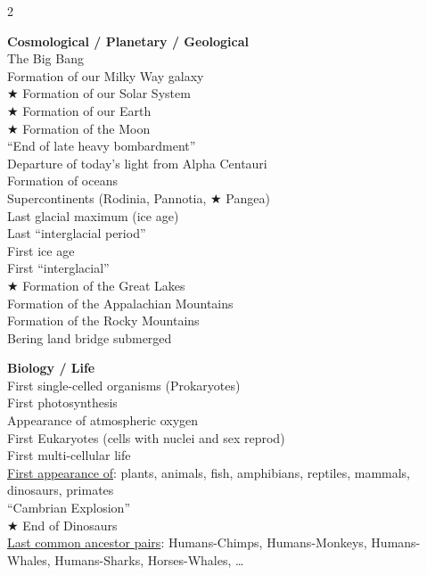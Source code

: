 \documentclass[12pt]{article}
\begin{document}
\begin{multicols}{2}


\begin{tcolorbox}[colback=white,colframe=black,boxrule=0.5pt,arc=2mm,
  left=4pt,right=4pt,top=6pt,bottom=6pt,height=11cm,valign=center]
\textbf{Cosmological / Planetary / Geological}\\[4pt]
The Big Bang\\
Formation of our Milky Way galaxy\\
$\bigstar$ Formation of our Solar System\\
$\bigstar$ Formation of our Earth\\
$\bigstar$ Formation of the Moon\\
``End of late heavy bombardment''\\
Departure of today's light from Alpha Centauri\\
Formation of oceans\\
Supercontinents (Rodinia, Pannotia, $\bigstar$ Pangea)\\
Last glacial maximum (ice age)\\
Last ``interglacial period''\\
First ice age\\
First ``interglacial''\\
$\bigstar$ Formation of the Great Lakes\\
Formation of the Appalachian Mountains\\
Formation of the Rocky Mountains\\
Bering land bridge submerged


\vspace{1.5cm}


\end{tcolorbox}
\vspace{6pt}
\begin{tcolorbox}[colback=white,colframe=black,boxrule=0.5pt,arc=2mm,
  left=4pt,right=4pt,top=6pt,bottom=6pt,height=11cm,valign=center]
\textbf{Biology / Life}\\[4pt]
First single-celled organisms (Prokaryotes)\\
First photosynthesis\\
Appearance of atmospheric oxygen\\
First Eukaryotes (cells with nuclei and sex reprod)\\
First multi-cellular life\\
\underline{First appearance of}: plants, animals, fish, amphibians, reptiles, mammals, dinosaurs, primates\\
``Cambrian Explosion''\\
$\bigstar$ End of Dinosaurs\\
\underline{Last common ancestor pairs}: Humans-Chimps, Humans-Monkeys, Humans-Whales, Humans-Sharks, Horses-Whales, \ldots



\end{tcolorbox}
\end{multicols}
\end{document}
